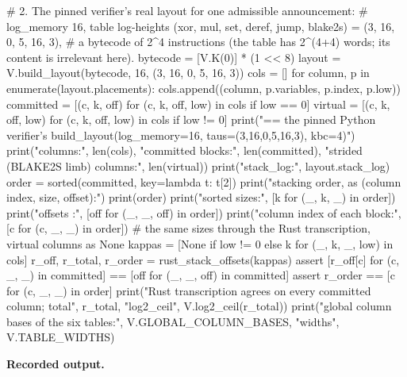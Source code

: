 \begin{srccode}
# 2. The pinned verifier's real layout for one admissible announcement:
#    log_memory 16, table log-heights (xor, mul, set, deref, jump, blake2s) = (3, 16, 0, 5, 16, 3),
#    a bytecode of 2^4 instructions (the table has 2^(4+4) words; its content is irrelevant here).
bytecode = [V.K(0)] * (1 << 8)
layout = V.build_layout(bytecode, 16, (3, 16, 0, 5, 16, 3))
cols = []
for column, p in enumerate(layout.placements):
    cols.append((column, p.variables, p.index, p.low))
committed = [(c, k, off) for (c, k, off, low) in cols if low == 0]
virtual = [(c, k, off, low) for (c, k, off, low) in cols if low != 0]
print("== the pinned Python verifier's build_layout(log_memory=16, taus=(3,16,0,5,16,3), kbc=4)")
print("columns:", len(cols), "committed blocks:", len(committed), "strided (BLAKE2S limb) columns:", len(virtual))
print("stack_log:", layout.stack_log)
order = sorted(committed, key=lambda t: t[2])
print("stacking order, as (column index, size, offset):")
print(order)
print("sorted sizes:", [k for (_, k, _) in order])
print("offsets     :", [off for (_, _, off) in order])
print("column index of each block:", [c for (c, _, _) in order])
# the same sizes through the Rust transcription, virtual columns as None
kappas = [None if low != 0 else k for (_, k, _, low) in cols]
r_off, r_total, r_order = rust_stack_offsets(kappas)
assert [r_off[c] for (c, _, _) in committed] == [off for (_, _, off) in committed]
assert r_order == [c for (c, _, _) in order]
print("Rust transcription agrees on every committed column; total", r_total, "log2_ceil", V.log2_ceil(r_total))
print("global column bases of the six tables:", V.GLOBAL_COLUMN_BASES, "widths", V.TABLE_WIDTHS)
\end{srccode}

\textbf{Recorded output.}

